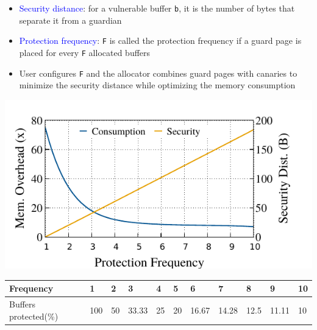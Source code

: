 \documentclass[landscape,a0paper,fontscale=0.3]{baposter} %
\begin{document}
\begin{poster}
{
    \begin{multicols}{2}
        \begin{itemize}
            \item \textcolor{blue}{Security distance}: for a vulnerable buffer \texttt{b}, it is the number of bytes that separate it from a guardian
            \item \textcolor{blue}{Protection frequency}: \texttt{F} is called the protection frequency if a guard page is placed for every \texttt{F} allocated buffers
            \item User configures \texttt{F} and the allocator combines guard pages with canaries to minimize the security distance while optimizing the memory consumption
        \end{itemize}

        \vspace{0.2cm}

        \centering
        \includegraphics[width=.65\columnwidth]{figures/blackscholes}
        \vspace*{5mm}
        \begin{minipage}{\columnwidth}
            \centering
            \resizebox{\columnwidth}{!}
            {%
            \begin{tabular}{l l l l l l l l l l l }
                \toprule\hline
                Frequency & 1 & 2 & 3 & 4 & 5 & 6 & 7 & 8 & 9 & 10 \\
                \midrule
                Buffers protected(\%) & 100 & 50 & 33.33 & 25	& 20 &	16.67 &	14.28 & 12.5 & 11.11 & 10 \\
                \hline\bottomrule
            \end{tabular}
            }
        \end{minipage}
                

\end{multicols}}
\end{poster}
\end{document}
